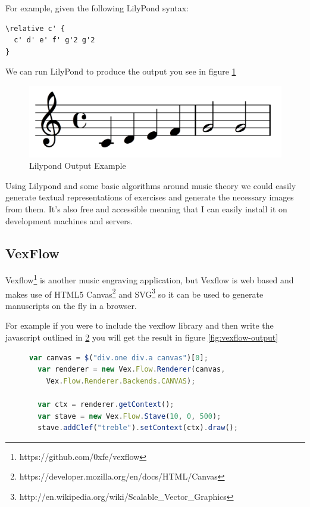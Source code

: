 For example, given the following LilyPond syntax:

\begin{lstlisting}
\relative c' {
  c' d' e' f' g'2 g'2
}
\end{lstlisting}

We can run LilyPond to produce the output you see in figure \ref{fig:lilypond-output}

\begin{figure}[h!]
  \includegraphics[width=\linewidth]{gfx/background/lilypond-output.png}
  \centering
  \caption{Lilypond Output Example}
  \label{fig:lilypond-output}
\end{figure}

Using Lilypond and some basic algorithms around music theory we could easily generate textual representations of exercises and generate the necessary images from them. It's also free and accessible meaning that I can easily install it on development machines and servers.

\subsection{VexFlow}

Vexflow\footnote{https://github.com/0xfe/vexflow} is another music engraving application, but Vexflow is web based and makes use of HTML5 Canvas\footnote{https://developer.mozilla.org/en/docs/HTML/Canvas} and SVG\footnote{http://en.wikipedia.org/wiki/Scalable\_Vector\_Graphics} so it can be used to generate manuscripts on the fly in a browser.

For example if you were to include the vexflow library and then write the javascript outlined in \ref{lst:vexflow} you will get the result in figure \ref{fig:vexflow-output}

\begin{figure}[h!]
  \begin{lstlisting}[language=JavaScript]
  var canvas = $("div.one div.a canvas")[0];
  var renderer = new Vex.Flow.Renderer(canvas,
    Vex.Flow.Renderer.Backends.CANVAS);

  var ctx = renderer.getContext();
  var stave = new Vex.Flow.Stave(10, 0, 500);
  stave.addClef("treble").setContext(ctx).draw();
  \end{lstlisting}
  \label{lst:vexflow}
\end{figure}

